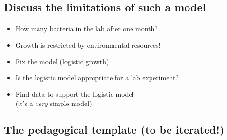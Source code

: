 \documentclass[%
twoside,                 %
final,                   %
10pt]{article}
\begin{document}
\noindent



\subsection{Discuss the limitations of such a model}


\paragraph{}
\begin{itemize}
 \item How many bacteria in the lab after one month?

 \item Growth is restricted by environmental resources!

 \item Fix the model (logistic growth)

 \item Is the logistic model appropriate for a lab experiment?

 \item Find data to support the logistic model \\
   (it's a \emph{very} simple model)
\end{itemize}

\noindent




\subsection{The pedagogical template (to be iterated!)}


\end{document}
